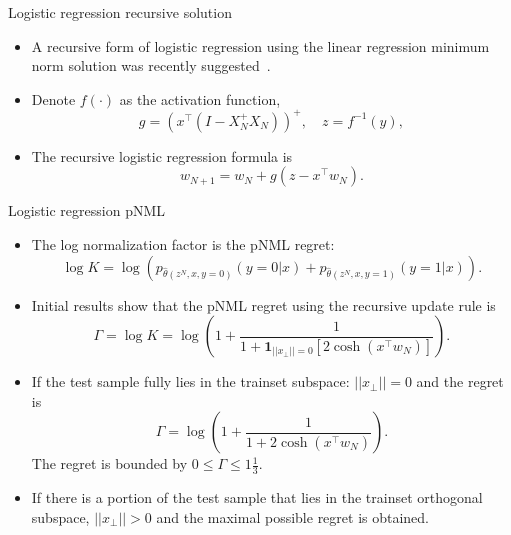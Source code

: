 \documentclass[aspectratio=169]{beamer}
\begin{document}
\begin{frame}{Logistic regression recursive solution}
\begin{itemize}
\item A recursive form of logistic regression using the linear regression minimum norm solution was recently suggested~.
\item Denote $f(\cdot)$ as the activation function, 
\begin{equation}
    g = \left(x^\top \left(I - X^+_N X_N \right) \right)^+, \quad  z = f^{-1}(y),
\end{equation}
\item The recursive logistic regression formula is
\begin{equation} \label{eq:logistig_regression_recurisve}
    w_{N+1} = w_N + g \left(z - x^\top w_N \right).
\end{equation}
\end{itemize}
\end{frame}

\begin{frame}{Logistic regression pNML}
\begin{itemize}
\item The log normalization factor is the pNML regret:
\begin{equation}
    \log K = \log \left(p_{\hat{\theta}(z^N,x,y=0)}(y=0|x) + p_{\hat{\theta}(z^N,x,y=1)}(y=1|x)\right).
\end{equation}
\item Initial results show that the pNML regret using the recursive update rule is
\begin{equation}
    \Gamma = \log K = \log \left(1 + \frac{1}{1 +  \mathbf{1}_{||x_\bot|| = 0} \left[ 2\cosh{\left(x^\top w_N \right)} \right]}\right).
\end{equation}
\item If the test sample fully lies in the trainset subspace: $||x_\bot||=0$ and the regret is
\begin{equation}
\Gamma = \log \left(1 + \frac{1}{1 + 2\cosh{\left(x^\top w_N \right)}}\right).
\end{equation}
The regret is bounded by $0 \leq \Gamma \leq 1\frac{1}{3}$.
\item If there is a portion of the test sample that lies in the trainset orthogonal subspace, $||x_\bot||>0$ and the maximal possible regret is obtained.
\end{itemize}
\end{frame}
\end{document}
